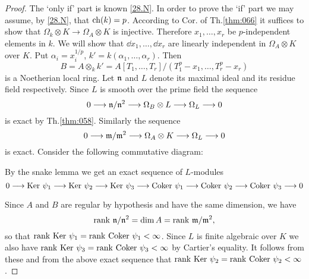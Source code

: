 \documentclass[../main]{subfiles}
\begin{document}
\begin{proof}
The `only if' part is known \ref{28.N}. In order to prove the `if' part we may assume, by \ref{28.N}, that $\operatorname{ch}(k) = p$. According to Cor. of Th.\ref{thm:066} it suffices to show that $\Omega_k \otimes K \longrightarrow \Omega_A \otimes K$ is injective. Therefore $x_1, \ldots, x_r$ be $p$-independent elements in $k$. We will show that $\dd x_1, \ldots, \dd x_r$ are linearly independent in $\Omega_A \otimes K$ over $K$. Put $\alpha_i = x_i^{1/p}$, $k' = k(\alpha_1, \ldots, \alpha_r)$. Then \[B = A \otimes_k k' = A[T_1, \ldots, T_r]/(T_1^p - x_1, \ldots, T_r^p - x_r)\] is a Noetherian local ring. Let $\mathfrak{n}$ and $L$ denote its maximal ideal and its residue field respectively. Since $L$ is smooth over the prime field the sequence \[0 \longrightarrow \mathfrak{n}/{\mathfrak{n}}^2 \longrightarrow \Omega_B \otimes L \longrightarrow \Omega_L \longrightarrow 0\] is exact by Th.\ref{thm:058}. Similarly the sequence \[0 \longrightarrow \mathfrak{m}/{\mathfrak{m}}^2 \longrightarrow \Omega_A \otimes K \longrightarrow \Omega_L \longrightarrow 0\] is exact. Consider the following commutative diagram:

\begin{center}
\end{center}
By the snake lemma we get an exact sequence of $L$-modules
\[
0 \longrightarrow \operatorname{Ker} \, \psi_1 \longrightarrow \operatorname{Ker} \, \psi_2 \longrightarrow \operatorname{Ker} \, \psi_3 \longrightarrow \operatorname{Coker} \, \psi_1 \longrightarrow \operatorname{Coker} \, \psi_2 \longrightarrow \operatorname{Coker} \, \psi_3 \longrightarrow 0
\]

Since $A$ and $B$ are regular by hypothesis and have the same dimension, we have \[\operatorname{rank} \, \mathfrak{n}/{\mathfrak{n}}^2 = \operatorname{dim} A = \operatorname{rank} \, \mathfrak{m}/{\mathfrak{m}}^2,\] so that $\operatorname{rank} \, \operatorname{Ker} \, \psi_1 = \operatorname{rank} \, \operatorname{Coker} \, \psi_1 < \infty$. Since $L$ is finite algebraic over $K$ we also have $\operatorname{rank} \, \operatorname{Ker} \, \psi_3 = \operatorname{rank} \, \operatorname{Coker} \, \psi_3 < \infty$ by Cartier's equality. It follows from these and from the above exact sequence that $\operatorname{rank} \, \operatorname{Ker} \, \psi_2 = \operatorname{rank} \, \operatorname{Coker} \, \psi_2 < \infty$.


\end{proof}
\end{document}

